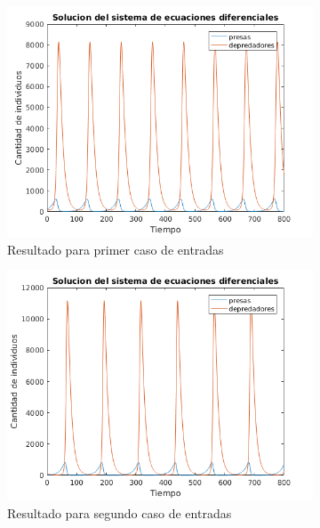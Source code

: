 \documentclass[12pt,letterpaper]{article}
\begin{document}
\begin{figure}
	\centering
	\begin{subfigure}[b]{0.36\textwidth}
		\includegraphics[width=\textwidth]{pictures/ejercicio_3_caso_1}
		\caption{Resultado para primer caso de entradas}
		\label{fig:ejercicio_3_caso_1}
	\end{subfigure}
	\begin{subfigure}[b]{0.36\textwidth}
		\includegraphics[width=\textwidth]{pictures/ejercicio_3_caso_2}
		\caption{Resultado para segundo caso de entradas}
		\label{fig:ejercicio_3_caso_2}
	\end{subfigure}
        \vfill
        \begin{subfigure}[b]{0.36\textwidth}

\end{subfigure}
\end{figure}
\end{document}
